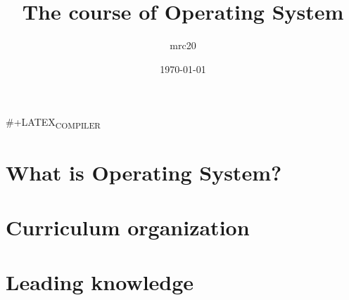 \documentclass[11pt]{article}
\author{mrc20}
\date{\today}
\title{The course of Operating System}
\begin{document}
\maketitle
\tableofcontents

\#+LATEX\textsubscript{COMPILER}
\section{What is Operating System?}
\label{sec:org04298da}
\section{Curriculum organization}
\label{sec:org1e997a1}
\section{Leading knowledge}
\label{sec:org6f0a03d}
\end{document}
